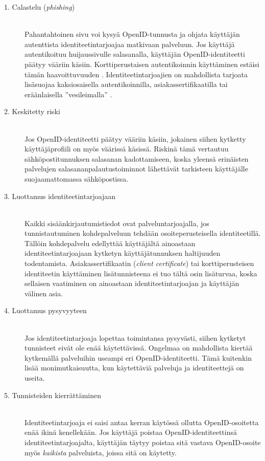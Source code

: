 \documentclass[english,gradu]{tktltiki}
\begin{document}
  \begin{description}

  \item[1. Calastelu (\emph{phishing})] \hfill \\
    Pahantahtoinen sivu voi kysyä OpenID-tunnusta ja ohjata käyttäjän autenttista identiteetintarjoajaa matkivaan palveluun. Jos käyttäjä autentikoituu huijaussivulle salasanalla, käyttäjän OpenID-identiteetti päätyy vääriin käsiin. Korttiperustaisen autentikoinnin käyttäminen estäisi tämän haavoittuvuuden \cite{cameron_infocard_07}. Identiteetintarjoajien on mahdollista tarjoata lisäsuojaa kaksiosaisella autentikoinnilla, asiakassertifikaatilla tai eräänlaisella ''vesileimalla'' \cite{yahoo_phishing_seal}.

   \item[2. Keskitetty riski] \hfill \\
      Jos OpenID-identiteetti päätyy vääriin käsiin, jokainen siihen kytketty käyttäjäprofiili on myös väärissä
      käsissä. Riskinä tämä vertautuu sähköpostitunnuksen salasanan kadottamiseen, koska yleensä erinäisten
      palvelujen salasananpalautustoiminnot lähettävät tarkisteen käyttäjälle suojaamattomassa sähköpostissa.

   \item[3. Luottamus identiteetintarjoajaan] \hfill \\
      Kaikki sisäänkirjautumistiedot ovat palveluntarjoajalla, jos tunnistautuminen kohdepalveluun tehdään
      osoiteperusteisella identiteetillä. Tällöin kohdepalvelu edellyttää käyttäjältä
      ainoastaan identiteetintarjoajaan kytketyn käyttäjätunnuksen haltijuuden todentamista.
      Asiakassertifikaatin (\emph{client certificate}) tai korttiperusteisen identiteetin käyttäminen
      lisätunnisteena ei tuo tältä osin lisäturvaa, koska sellaisen vaatiminen on ainoastaan
      identiteetintarjoajan ja käyttäjän välinen asia.

   \item[4. Luottamus pysyvyyteen] \hfill \\
      Jos identiteetintarjoaja lopettaa toimintansa pysyvästi, siihen kytketyt tunnisteet eivät ole enää
      käytettävissä. Ongelmaa on mahdollista kiertää kytkemällä palveluihin useampi eri OpenID-identiteetti.
      Tämä kuitenkin lisää monimutkaisuutta, kun käytettäviä palveluja ja identiteettejä on useita.

  \item[5. Tunnisteiden kierrättäminen] \hfill \\
    Identiteetintarjoaja ei saisi antaa kerran käytössä ollutta OpenID-osoitetta enää ikinä kenellekään.
    Jos käyttäjä poistaa OpenID-identiteettinsä identiteetintarjoajalta, käyttäjän täytyy poistaa sitä vastava
    OpenID-osoite
    myös \emph{kaikista} palveluista, joissa sitä on käytetty.


\end{description}
\end{document}
